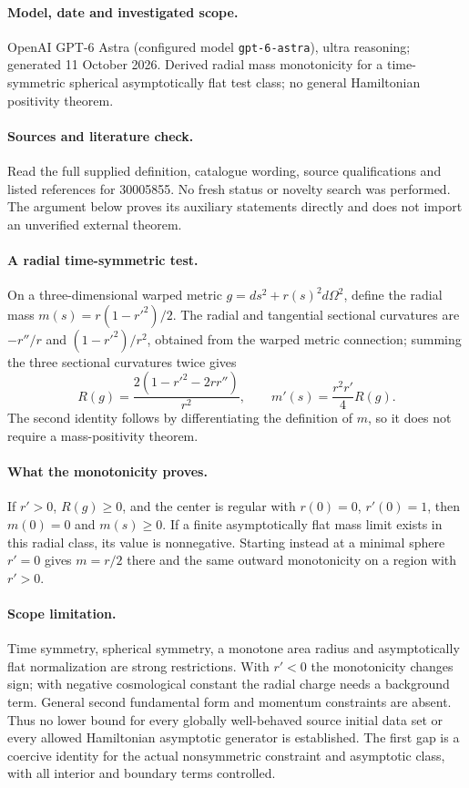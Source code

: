 \documentclass[11pt]{article}
\begin{document}
\paragraph{Model, date and investigated scope.}
OpenAI GPT-6 Astra (configured model \texttt{gpt-6-astra}), ultra reasoning; generated 11 October 2026. Derived radial mass monotonicity for a time-symmetric spherical asymptotically flat test class; no general Hamiltonian positivity theorem.

\paragraph{Sources and literature check.}
Read the full supplied definition, catalogue wording, source qualifications and listed references for 30005855. No fresh status or novelty search was performed. The argument below proves its auxiliary statements directly and does not import an unverified external theorem.

\paragraph{A radial time-symmetric test.} On a three-dimensional warped metric \(g=ds^2+r(s)^2d\Omega^2\), define the radial mass \(m(s)=r(1-r'^2)/2\). The radial and tangential sectional curvatures are \(-r''/r\) and \((1-r'^2)/r^2\), obtained from the warped metric connection; summing the three sectional curvatures twice gives
\[
 R(g)=\frac{2(1-r'^2-2rr'')}{r^2},\qquad
 m'(s)=\frac{r^2r'}4R(g).
\]
The second identity follows by differentiating the definition of \(m\), so it does not require a mass-positivity theorem.
\paragraph{What the monotonicity proves.} If \(r'>0\), \(R(g)\geq0\), and the center is regular with \(r(0)=0\), \(r'(0)=1\), then \(m(0)=0\) and \(m(s)\geq0\). If a finite asymptotically flat mass limit exists in this radial class, its value is nonnegative. Starting instead at a minimal sphere \(r'=0\) gives \(m=r/2\) there and the same outward monotonicity on a region with \(r'>0\).
\paragraph{Scope limitation.} Time symmetry, spherical symmetry, a monotone area radius and asymptotically flat normalization are strong restrictions. With \(r'<0\) the monotonicity changes sign; with negative cosmological constant the radial charge needs a background term. General second fundamental form and momentum constraints are absent. Thus no lower bound for every globally well-behaved source initial data set or every allowed Hamiltonian asymptotic generator is established. The first gap is a coercive identity for the actual nonsymmetric constraint and asymptotic class, with all interior and boundary terms controlled.
\end{document}

